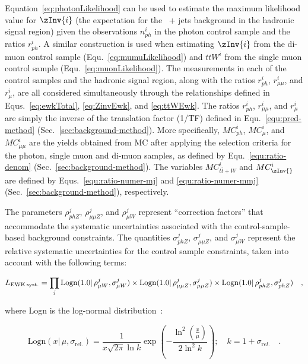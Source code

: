 Equation~\ref{eq:photonLikelihood} can be used to estimate the maximum
likelihood value for $\zInv{i}$ (the expectation for the \znunu\ +
jets background in the hadronic signal region) given the observations
$n_{ph}^i$ in the photon control sample and the ratios $r_{ph}^i$. A
similar construction is used when estimating $\zInv{i}$ from the
di-muon control sample (Equ.~\ref{eq:mumuLikelihood}) and $ttW^{i}$
from the single muon control sample
(Equ.~\ref{eq:muonLikelihood}). The measurements in each of the
control samples and the hadronic signal region, along with the ratios
$r_{ph}^{i}$, $r_{\mu\mu}^{i}$, and $r_{\mu}^{i}$, are all considered
simultaneously through the relationships defined in
Equs.~\ref{eq:ewkTotal}, \ref{eq:ZinvEwk}, and
\ref{eq:ttWEwk}. The ratios $r_{ph}^{i}$, $r_{\mu\mu}^{i}$, and
$r_{\mu}^{i}$ are simply the inverse of the translation factor (1/TF)
defined in Equ.~\ref{equ:pred-method}
(Sec.~\ref{sec:background-method}). More specifically, $MC_{ph}^i$,
$MC_{\mu}^i$, and $MC_{\mu\mu}^i$ are the yields obtained from MC
after applying the selection criteria for the photon, single muon and
di-muon samples, as defined by Equ.~\ref{equ:ratio-denom}
(Sec.~\ref{sec:background-method}). The variables $MC_{t\bar{t}+W}^i$ and
$MC_{\zInv{}}^i$ are defined by Equs.~\ref{equ:ratio-numer-mj} and
\ref{equ:ratio-numer-mmj} (Sec.~\ref{sec:background-method}), respectively.

The parameters $\rho_{phZ}^j$, $\rho_{\mu\mu Z}^j$, and $\rho_{\mu
  W}^j$ represent ``correction factors'' that accommodate the
systematic uncertainties associated with the control-sample-based
background constraints.  The quantities $\sigma_{phZ}^j$,
$\sigma_{\mu\mu Z}^j$, and $\sigma_{\mu W}^j$ represent the relative
systematic uncertainties for the control sample constraints, taken
into account with the following terms:

\begin{equation}
\label{eq:ewkSyst}
L_{\rm EWK\, syst.}=\prod_j \mathrm{Logn}( 1.0 |\,\rho_{\mu W}^j,
\sigma_{\mu W}^j)\times \mathrm{Logn}( 1.0 |\,\rho_{\mu\mu Z}^j,
\sigma_{\mu\mu Z}^j)\times \mathrm{Logn}( 1.0 |\,\rho_{phZ}^j,
\sigma_{phZ}^j) \quad ,
\end{equation}

where Logn is the log-normal
distribution~\cite{cousins-log-normal}:

\begin{equation}
\label{eq:log-normal}
\mathrm{Logn}(x |\,\mu,\sigma_{\mathrm{rel.}}) =
\frac{1}{x\sqrt{2\pi}\ln{k}}\exp{\left(-\frac{\ln^2{\left(\frac{x}{\mu}\right)}}{2\ln^2{k}}\right)};\quad
k=1+\sigma_{\mathrm rel.}\quad. 
\end{equation}

